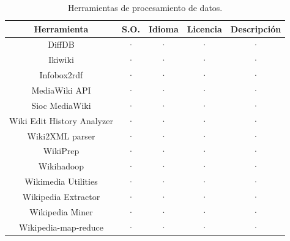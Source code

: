 \documentclass[11pt,onecolumn]{article}
\begin{document}
\begin{table}
\centering
\begin{tabular}{| c | c | c | c | c |}
\hline
\textbf{Herramienta} & \textbf{S.O.} & \textbf{Idioma} & \textbf{Licencia} & \textbf{Descripción} \\
\hline
DiffDB & · & · & · & · \\ \hline 
Ikiwiki & · & · & · & · \\ \hline 
Infobox2rdf & · & · & · & · \\ \hline 
MediaWiki API & · & · & · & · \\ \hline 
Sioc MediaWiki & · & · & · & · \\ \hline 
Wiki Edit History Analyzer & · & · & · & · \\ \hline 
Wiki2XML parser & · & · & · & · \\ \hline 
WikiPrep & · & · & · & · \\ \hline 
Wikihadoop & · & · & · & · \\ \hline 
Wikimedia Utilities & · & · & · & · \\ \hline 
Wikipedia Extractor & · & · & · & · \\ \hline 
Wikipedia Miner & · & · & · & · \\ \hline 
Wikipedia-map-reduce & · & · & · & · \\ \hline 
\end{tabular}
\caption{Herramientas de procesamiento de datos.}
\label{tab:dataprocessingtoolstable}
\end{table}
\end{document}
